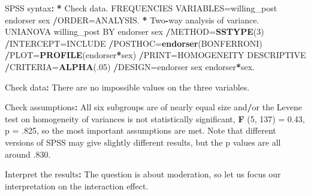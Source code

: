 \documentclass[a4paper]{book}
\newenvironment{Shaded}{\begin{snugshade}}{\end{snugshade}}
\newcommand{\KeywordTok}[1]{\textcolor[rgb]{0,0,0}{\textbf{#1}}}
\newcommand{\DecValTok}[1]{\textcolor[rgb]{0.00,0.00,0.00}{#1}}
\newcommand{\FloatTok}[1]{\textcolor[rgb]{0.00,0.00,0.00}{#1}}
\newcommand{\StringTok}[1]{\textcolor[rgb]{0.00,0.00,0.00}{#1}}
\newcommand{\OperatorTok}[1]{\textcolor[rgb]{0.00,0.00,0.00}{\textbf{#1}}}
\newcommand{\ErrorTok}[1]{\textcolor[rgb]{0.00,0.00,0.00}{\textbf{#1}}}
\newcommand{\NormalTok}[1]{#1}
\theoremstyle{definition}
\theoremstyle{definition}
\theoremstyle{definition}
\theoremstyle{remark}
\begin{document}
\begin{Shaded}
\begin{Highlighting}[]
\NormalTok{SPSS syntax}\OperatorTok{:}\StringTok{  }
\StringTok{  }
\ErrorTok{*}\StringTok{ }\NormalTok{Check data.  }
\NormalTok{FREQUENCIES VARIABLES=willing_post endorser sex  }
  \OperatorTok{/}\NormalTok{ORDER=ANALYSIS.  }
\OperatorTok{*}\StringTok{ }\NormalTok{Two}\OperatorTok{-}\NormalTok{way analysis of variance.  }
\NormalTok{UNIANOVA willing_post BY endorser sex  }
  \OperatorTok{/}\NormalTok{METHOD=}\KeywordTok{SSTYPE}\NormalTok{(}\DecValTok{3}\NormalTok{)  }
  \OperatorTok{/}\NormalTok{INTERCEPT=INCLUDE  }
  \OperatorTok{/}\NormalTok{POSTHOC=}\KeywordTok{endorser}\NormalTok{(BONFERRONI)   }
  \OperatorTok{/}\NormalTok{PLOT=}\KeywordTok{PROFILE}\NormalTok{(endorser}\OperatorTok{*}\NormalTok{sex)  }
  \OperatorTok{/}\NormalTok{PRINT=HOMOGENEITY DESCRIPTIVE  }
  \OperatorTok{/}\NormalTok{CRITERIA=}\KeywordTok{ALPHA}\NormalTok{(.}\DecValTok{05}\NormalTok{)  }
  \OperatorTok{/}\NormalTok{DESIGN=endorser sex endorser}\OperatorTok{*}\NormalTok{sex.  }
  
\NormalTok{Check data}\OperatorTok{:}\StringTok{  }
\StringTok{  }
\NormalTok{There are no impossible values on the three variables.  }
  
\NormalTok{Check assumptions}\OperatorTok{:}\StringTok{  }
\StringTok{  }
\NormalTok{All six subgroups are of nearly equal size and}\OperatorTok{/}\NormalTok{or the Levene test on}
\NormalTok{homogeneity of variances is not statistically significant, }\KeywordTok{F}\NormalTok{ (}\DecValTok{5}\NormalTok{, }\DecValTok{137}\NormalTok{) =}\StringTok{ }\FloatTok{0.43}\NormalTok{,}
\NormalTok{p =}\StringTok{ }\NormalTok{.}\DecValTok{825}\NormalTok{, so the most important assumptions are met. Note that different}
\NormalTok{versions of SPSS may give slightly different results, but the p values are all}
\NormalTok{around .}\DecValTok{830}\NormalTok{.}
  
\NormalTok{Interpret the results}\OperatorTok{:}\StringTok{  }
\StringTok{  }
\NormalTok{The question is about moderation, so let us focus our interpretation on the  }
\NormalTok{interaction effect.  }
  

\end{Highlighting}
\end{Shaded}
\end{document}

